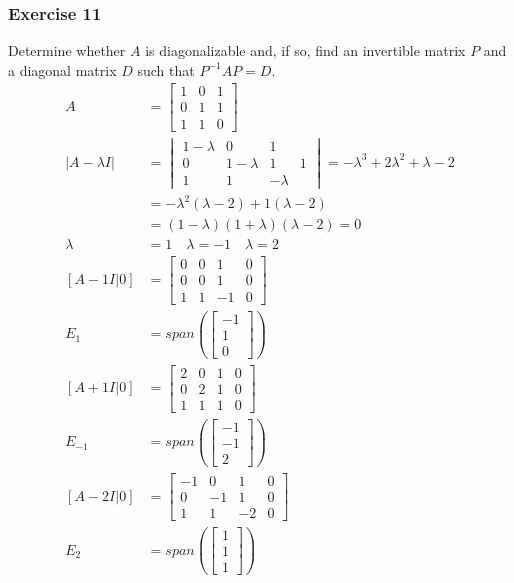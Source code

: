 \documentclass{math}
\begin{document}
\subsubsection*{Exercise 11}
Determine whether \( A \) is diagonalizable and, if so, find an invertible
matrix \( P \) and a diagonal matrix \( D \) such that \( P^{-1}AP = D \).
\begin{align*}
  A &= \begin{bmatrix}
    1 & 0 & 1 \\
    0 & 1 & 1 \\
    1 & 1 & 0
  \end{bmatrix} \\
  |A-\lambda I| &= \begin{vmatrix}
    1-\lambda & 0 & 1 \\
    0 & 1-\lambda & 1 & 1 \\
    1 & 1 & -\lambda
  \end{vmatrix} = -\lambda^3+2\lambda^2+\lambda-2 \\
  &= -\lambda^2(\lambda-2)+1(\lambda-2) \\
  &= (1-\lambda)(1+\lambda)(\lambda-2) = 0 \\
  \lambda &= 1 \quad \lambda = -1 \quad \lambda = 2 \\
  [A-1I|0] &= \begin{bmatrix}
    0 & 0 & 1 & 0\\
    0 & 0 & 1 & 0 \\
    1 & 1 & -1 & 0
  \end{bmatrix} \\
  E_1 &= span\left(\begin{bmatrix}-1 \\ 1 \\ 0\end{bmatrix}\right) \\
  [A+1I|0] &= \begin{bmatrix}
    2 & 0 & 1 & 0 \\
    0 & 2 & 1 & 0 \\
    1 & 1 & 1 & 0
  \end{bmatrix} \\
  E_{-1} &= span\left(\begin{bmatrix}-1 \\ -1 \\ 2\end{bmatrix}\right) \\
  [A-2I|0] &= \begin{bmatrix}
    -1 & 0 & 1 & 0 \\
    0 & -1 & 1 & 0 \\
    1 & 1 & -2 & 0
  \end{bmatrix} \\
  E_2 &= span\left(\begin{bmatrix}1 \\ 1 \\ 1\end{bmatrix}\right)
\end{align*}
\end{document}
